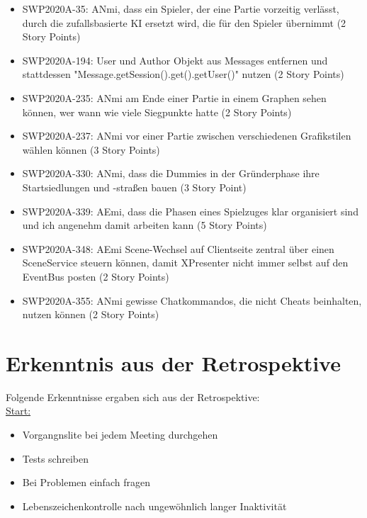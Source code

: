 \documentclass[12pt,a4paper, oneside]{article}
\begin{document}
\begin{itemize}
    \item SWP2020A-35: ANmi, dass ein Spieler, der eine Partie vorzeitig verlässt, durch die zufallsbasierte KI ersetzt wird, die für den Spieler übernimmt (2 Story Points)

    \item SWP2020A-194: User und Author Objekt aus Messages entfernen und stattdessen "Message.getSession().get().getUser()" nutzen (2 Story Points)

    \item SWP2020A-235: ANmi am Ende einer Partie in einem Graphen sehen können, wer wann wie viele Siegpunkte hatte (2 Story Points)

    \item SWP2020A-237: ANmi vor einer Partie zwischen verschiedenen Grafikstilen wählen können (3 Story Points)

    \item SWP2020A-330:	ANmi, dass die Dummies in der Gründerphase ihre Startsiedlungen und -straßen bauen (3 Story Point)

    \item SWP2020A-339: AEmi, dass die Phasen eines Spielzuges klar organisiert sind und ich angenehm damit arbeiten kann (5 Story Points)

    \item SWP2020A-348:	AEmi Scene-Wechsel auf Clientseite zentral über einen SceneService steuern können, damit XPresenter nicht immer selbst auf den EventBus posten (2 Story Points)

    \item SWP2020A-355:	ANmi gewisse Chatkommandos, die nicht Cheats beinhalten, nutzen können (2 Story Points)
\end{itemize}


\section{Erkenntnis aus der Retrospektive}

Folgende Erkenntnisse ergaben sich aus der Retrospektive:
\\

\underline{Start:}

\begin{itemize}
    \item Vorgangnslite bei jedem Meeting durchgehen
    \item Tests schreiben
    \item Bei Problemen einfach fragen
    \item Lebenszeichenkontrolle nach ungewöhnlich langer Inaktivität
\end{itemize}
\end{document}
